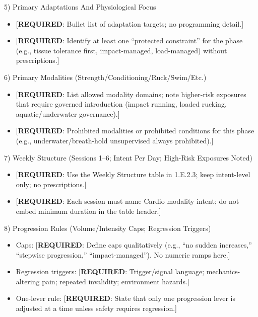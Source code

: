 \documentclass[10pt]{article}
\begin{document}
5) Primary Adaptations And Physiological Focus

\begin{itemize}
\item {[\textbf{REQUIRED}: Bullet list of adaptation targets; no programming detail.]}
\item {[\textbf{REQUIRED}: Identify at least one “protected constraint” for the phase (e.g., tissue tolerance first, impact-managed, load-managed) without prescriptions.]}
\end{itemize}

6) Primary Modalities (Strength/Conditioning/Ruck/Swim/Etc.)

\begin{itemize}
\item {[\textbf{REQUIRED}: List allowed modality domains; note higher-risk exposures that require governed introduction (impact running, loaded rucking, aquatic/underwater governance).]}
\item {[\textbf{REQUIRED}: Prohibited modalities or prohibited conditions for this phase (e.g., underwater/breath-hold unsupervised always prohibited).]}
\end{itemize}

7) Weekly Structure (Sessions 1–6; Intent Per Day; High-Risk Exposures Noted)

\begin{itemize}
\item {[\textbf{REQUIRED}: Use the Weekly Structure table in 1.E.2.3; keep intent-level only; no prescriptions.]}
\item {[\textbf{REQUIRED}: Each session must name Cardio modality intent; do not embed minimum duration in the table header.]}
\end{itemize}

8) Progression Rules (Volume/Intensity Caps; Regression Triggers)

\begin{itemize}
\item Caps: [\textbf{REQUIRED}: Define caps qualitatively (e.g., “no sudden increases,” “stepwise progression,” “impact-managed”). No numeric ramps here.]
\item Regression triggers: [\textbf{REQUIRED}: Trigger/signal language; mechanics-altering pain; repeated invalidity; environment hazards.]
\item One-lever rule: [\textbf{REQUIRED}: State that only one progression lever is adjusted at a time unless safety requires regression.]
\end{itemize}
\end{document}
